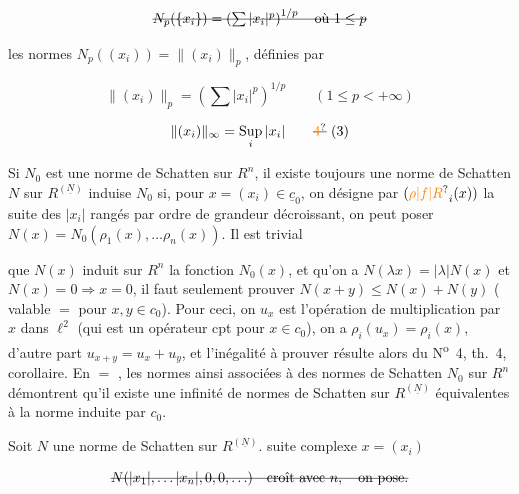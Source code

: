 \[
\deleted{N_p(\{x_i\})=\left(\sum |x_i|^p\right)^{1/p}\quad\text{où }1\leq p}
\]

les normes $N_p((x_i))=\lVert(x_i)\rVert_p$, définies par 

\[
\lVert(x_i)\rVert_p=\left(\sum |x_i|^p\right)^{1/p}\qquad (1\leq p<+\infty)\tag*{(2)}
\]

\[
\lVert(x_i)\rVert_\infty=\underset{i}{\operatorname{Sup}}\,|x_i|\tag*{\deleted{\unsure{4}} (3)}
\]

Si $N_0$ est une norme de Schatten  sur $R^n$, il existe toujours une norme de Schatten $N$ sur $R^{(\underline N)}$  induise $N_0$ si, pour  $x=(x_i)\in\underline{c}_0$, on désigne par $(\unsure{\rho|f|R}_i(x))$ la suite des $|x_i|$  rangés par ordre de grandeur décroissant, on peut  poser $N(x)=N_0(\rho_1(x),\ldots\rho_n(x))$. Il est trivial


que $N(x)$ induit sur $R^n$ la fonction $N_0(x)$, et qu'on a $N(\lambda x)=|\lambda|N(x)$ et $N(x)=0\Rightarrow x=0$, il faut seulement prouver $N(x+y)\leq N(x)+N(y)$ ( valable $=$ pour $x,y\in c_0$). Pour ceci, on  $u_x$ est l'opération de multiplication par $x$ dans $\ell^2$ (qui est un opérateur cpt pour $x\in c_0$), on a  $\rho_i(u_x)=\rho_i(x)$, d'autre part  $u_{x+y}=u_x+u_y$, et l'inégalité à prouver résulte alors du N\textsuperscript{o}~4, th.~4, corollaire. En $=$ , les normes  ainsi associées à des normes  de Schatten $N_0$ sur $R^{n}$  démontrent qu'il existe une infinité  de normes de Schatten sur $R^{(\underline N)}$ équivalentes à la norme induite par $c_0$.

Soit $N$  une norme de Schatten sur  $R^{(\underline N)}$.  suite  complexe $x=(x_i)$ 

\[
\deleted{N(|x_1|,\ldots |x_n|,0,0,\ldots)\quad\text{croît avec }n,\quad\text{on pose.}}
\]

